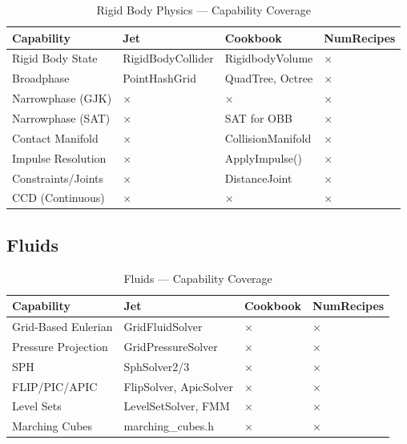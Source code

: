 \documentclass[11pt]{article}
\newcommand{\Impl}{\checkmark}
\newcommand{\Part}{\textopenbullet}
\newcommand{\Miss}{$\times$}
\begin{document}
\begin{table}[htbp]
\centering
\small
\caption{Rigid Body Physics --- Capability Coverage}
\begin{tabularx}{\textwidth}{@{} p{3cm} X X X @{}}
\toprule
\textbf{Capability} & \textbf{Jet} & \textbf{Cookbook} & \textbf{NumRecipes} \\
\midrule
Rigid Body State & \Part{} RigidBodyCollider & \Impl{} RigidbodyVolume & \Miss{} \\
Broadphase & \Impl{} PointHashGrid & \Impl{} QuadTree, Octree & \Miss{} \\
Narrowphase (GJK) & \Miss{} & \Miss{} & \Miss{} \\
Narrowphase (SAT) & \Miss{} & \Impl{} SAT for OBB & \Miss{} \\
Contact Manifold & \Miss{} & \Impl{} CollisionManifold & \Miss{} \\
Impulse Resolution & \Miss{} & \Impl{} ApplyImpulse() & \Miss{} \\
Constraints/Joints & \Miss{} & \Part{} DistanceJoint & \Miss{} \\
CCD (Continuous) & \Miss{} & \Miss{} & \Miss{} \\
\bottomrule
\end{tabularx}
\end{table}

\subsection{Fluids}

\begin{table}[htbp]
\centering
\small
\caption{Fluids --- Capability Coverage}
\begin{tabularx}{\textwidth}{@{} p{3cm} X X X @{}}
\toprule
\textbf{Capability} & \textbf{Jet} & \textbf{Cookbook} & \textbf{NumRecipes} \\
\midrule
Grid-Based Eulerian & \Impl{} GridFluidSolver & \Miss{} & \Miss{} \\
Pressure Projection & \Impl{} GridPressureSolver & \Miss{} & \Miss{} \\
SPH & \Impl{} SphSolver2/3 & \Miss{} & \Miss{} \\
FLIP/PIC/APIC & \Impl{} FlipSolver, ApicSolver & \Miss{} & \Miss{} \\
Level Sets & \Impl{} LevelSetSolver, FMM & \Miss{} & \Miss{} \\
Marching Cubes & \Impl{} marching\_cubes.h & \Miss{} & \Miss{} \\
\bottomrule
\end{tabularx}
\end{table}
\end{document}
